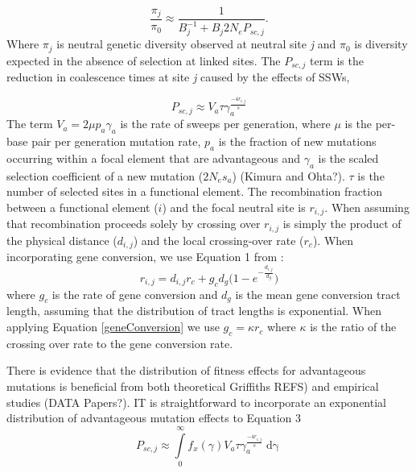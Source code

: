 \begin{equation}
\label{jointApprox}
\frac{\pi_{j}}{\pi_{0}} \approx  \frac{1}{B_{j}^{-1}  + B_{j}2N_eP_{sc,j}}.
\end{equation}
	Where $\pi_j$ is neutral genetic diversity observed at neutral site \textit{j} and $\pi_0$ is diversity expected in the absence of selection at linked sites. The $P_{sc,j}$ term is the reduction in coalescence times at site \textit{j} caused by the effects of SSWs,

\begin{equation}
\label{singleClass}
P_{sc,j} \approx V_a \tau\gamma_a^{\frac{-4r_{i,j}}{s}} 
\end{equation}
The term $V_{a} = 2 \mu p_{a} \gamma_{a}$ is the rate of sweeps per generation, where $\mu$ is the per-base pair per generation mutation rate, $p_a$ is the fraction of new mutations occurring within a focal element that are advantageous and $\gamma_a$ is the scaled selection coefficient of a new mutation ($2N_es_a$) (Kimura and Ohta?). $\tau$ is the number of selected sites in a functional element. The recombination fraction between a functional element ($i$) and the focal neutral site is $r_{i,j}$. When assuming that recombination proceeds solely by crossing over $r_{i,j}$ is simply the product of the physical distance ($d_{i,j}$) and the local crossing-over rate ($r_c$). When incorporating gene conversion, we use Equation 1 from  \cite{RN361}:
 		\begin{equation}
		\label{geneConversion}
		r_{i,j} = d_{i,j} r_c + g_c d_g \Bigg( 1 - e ^{-\frac{d_{i,j}}{d_g}} \Bigg)
		\end{equation} where $g_c$ is the rate of gene conversion and $d_g$ is the mean gene conversion tract length, assuming that the distribution of tract lengths is exponential. When applying Equation \ref{geneConversion} we use $g_c = \kappa r_c$ where $\kappa$ is the ratio of the crossing over rate to the gene conversion rate.
	
	There is evidence that the distribution of fitness effects for advantageous mutations is beneficial from both theoretical \cite{RN362} Griffiths REFS) and empirical studies (DATA Papers?). IT is straightforward to incorporate an exponential distribution of advantageous mutation effects to Equation 3
		\begin{equation}
		\label{exponential}
P_{sc,j} \approx \int \limits_{0}^{\infty} f_x(\gamma) V_a \tau\gamma_a^{\frac{-4r_{i,j}}{s}} \mathop{d\gamma}
		\end{equation}

